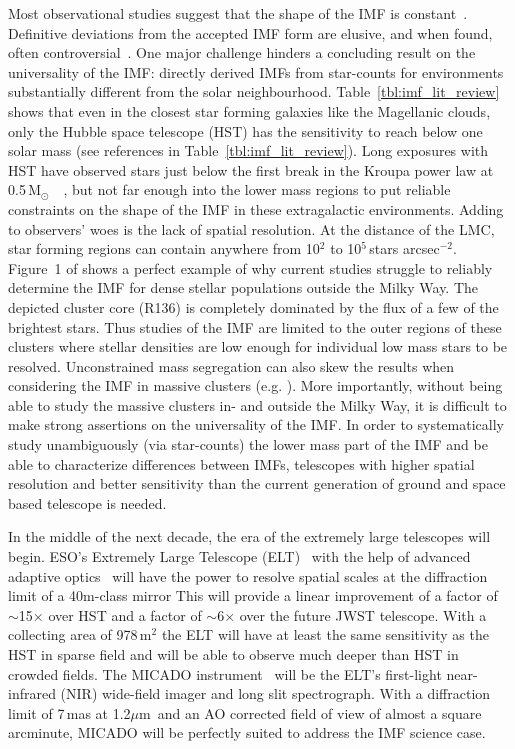 \documentclass{aa}
\newcommand{\um}{$\mu$m~}
\newcommand{\msun}{M$_\odot$~}
\newcommand{\s}{$\sim$}
\newcommand{\h}[1]{$^{#1}$}
\newcommand{\spae}{stars arcsec$^{-2}$}
\begin{document}
Most observational studies suggest that the shape of the IMF is constant~\citep{Lada2003-ip,Kroupa2002,Bastian2010}.
Definitive deviations from the accepted IMF form are elusive, and when found, often controversial~\citep{Van_Dokkum2010-gx,Conroy2012-hv,Drass2016-kp}.
One major challenge hinders a concluding result on the universality of the IMF:  directly derived IMFs from star-counts for environments substantially different from the solar neighbourhood.
Table~\ref{tbl:imf_lit_review} shows that even in the closest star forming galaxies like the Magellanic clouds, only the Hubble space telescope (HST) has the sensitivity to reach below one solar mass (see references in Table~\ref{tbl:imf_lit_review}).
Long exposures with HST have observed stars just below the first break in the Kroupa power law at 0.5\,\msun~\citep{dario2009,kalirai2013,geha2013}, but not far enough into the lower mass regions to put reliable constraints on the shape of the IMF in these extragalactic environments.
Adding to observers' woes is the lack of spatial resolution.
At the distance of the LMC, star forming regions can contain anywhere from 10\h2 to 10\h5\,\spae.
Figure~1 of \citet{sirianni2000} shows a perfect example of why current studies struggle to reliably determine the IMF for dense stellar populations outside the Milky Way.
The depicted cluster core (R136) is completely dominated by the flux of a few of the brightest stars.
Thus studies of the IMF are limited to the outer regions of these clusters where stellar densities are low enough for individual low mass stars to be resolved.
Unconstrained mass segregation can also skew the results when considering the IMF in massive clusters (e.g. \citealt{Ascenso2009-de}).
More importantly, without being able to study the massive clusters in- and outside the Milky Way, it is difficult to make strong assertions on the universality of the IMF. In order to systematically study unambiguously (via star-counts) the lower mass part of the IMF and be able to characterize differences between IMFs, telescopes with higher spatial resolution and better sensitivity than the current generation of ground and space based telescope is needed.

In the middle of the next decade, the era of the extremely large telescopes will begin.
ESO's Extremely Large Telescope (ELT)~\citep{eelt} with the help of advanced adaptive optics~\citep{maory} will have the power to resolve spatial scales at the diffraction limit of a 40m-class mirror
This will provide a linear improvement of a factor of \s15$\times$ over HST and a factor of \s6$\times$ over the future JWST telescope.
With a collecting area of 978\,m\h2 the ELT will have at least the same sensitivity as the HST in sparse field and will be able to observe much deeper than HST in crowded fields.
The MICADO instrument~\citep{micado2016, micado2018} will be the ELT's first-light near-infrared (NIR) wide-field imager and long slit spectrograph.
With a diffraction limit of 7\,mas at 1.2\um and an AO corrected field of view of almost a square arcminute, MICADO will be perfectly suited to address the IMF science case.
\end{document}
